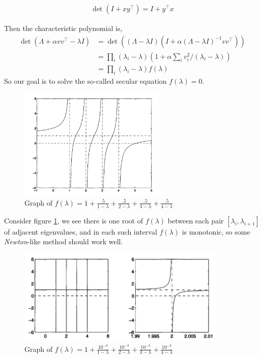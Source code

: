 \documentclass[11pt]{article}
\numberwithin{equation}{section}
\begin{document}
\begin{lemma}
    \begin{align*}
        \operatorname{det}\left( I + xy^\top \right) = I + y^\top x
    \end{align*}
\end{lemma}

Then the characteristic polynomial is, \begin{align*}
    \operatorname{det}\left( \Lambda + \alpha vv^\top - \lambda I \right) &= \operatorname{det}\left( (\Lambda - \lambda I)(I+\alpha(\Lambda-\lambda I)^{-1} v v^{\top})\right)\\
    &= \prod_i \left(\lambda_{i}-\lambda\right)\left( 1 + \alpha \sum_i v_i^2 / (\lambda_{i}-\lambda) \right) \\
    &= \prod_i \left(\lambda_{i}-\lambda\right) f(\lambda)
\end{align*}
So our goal is to solve the so-called secular equation $f(\lambda)=0$.

\begin{figure}
    \centering
    \includegraphics[width = 7cm]{images/lec10-1.png}
    \caption{Graph of $f(\lambda)=1+\frac{.5}{1-\lambda}+\frac{.5}{2-\lambda}+\frac{.5}{3-\lambda}+\frac{.5}{4-\lambda}$}
    \label{fig:10-1}
\end{figure}

Consider figure \ref{fig:10-1}, we see there is one root of $f(\lambda)$ between each pair $[\lambda_i, \lambda_{i+1}]$ of adjacent eigenvalues, 
and in each such interval $f(\lambda)$ is monotonic, so some \textit{Newton}-like method should work well.

\begin{figure}
    \centering
    \includegraphics[width = 10cm]{images/lec10-2.png}
    \caption{Graph of $f(\lambda)=1+\frac{10^{-3}}{1-\lambda}+\frac{10^{-3}}{2-\lambda}+\frac{10^{-3}}{3-\lambda}+\frac{10^{-3}}{4-\lambda}$}
    \label{fig:10-2}
\end{figure}
\end{document}
